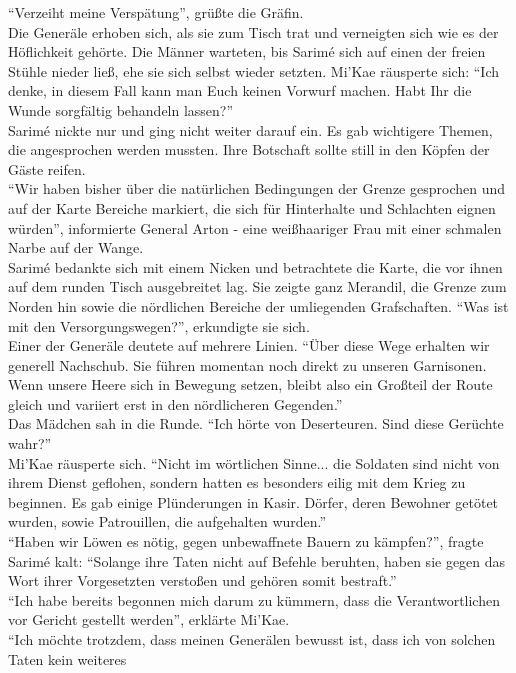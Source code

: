 ``Verzeiht meine Verspätung'', grüßte die Gräfin.\\
Die Generäle erhoben sich, als sie zum Tisch trat und verneigten sich wie es der Höflichkeit 
gehörte. Die Männer warteten, bis Sarimé sich auf einen der freien Stühle nieder ließ, ehe sie sich 
selbst wieder setzten. Mi'Kae räusperte sich: ``Ich denke, in diesem Fall kann man Euch keinen 
Vorwurf machen. Habt Ihr die Wunde sorgfältig behandeln lassen?''\\
Sarimé nickte nur und ging nicht weiter darauf ein. Es gab wichtigere Themen, die angesprochen 
werden mussten. Ihre Botschaft sollte still in den Köpfen der Gäste reifen.\\
``Wir haben bisher über die natürlichen Bedingungen der Grenze gesprochen und auf der Karte 
Bereiche markiert, die sich für Hinterhalte und Schlachten eignen würden'', informierte General 
Arton - eine weißhaariger Frau mit einer schmalen Narbe auf der Wange.\\
Sarimé bedankte sich mit einem Nicken und betrachtete die Karte, die vor ihnen auf dem runden Tisch 
ausgebreitet lag. Sie zeigte ganz Merandil, die Grenze zum Norden hin sowie die nördlichen Bereiche 
der umliegenden Grafschaften. ``Was ist mit den Versorgungswegen?'', erkundigte sie sich.\\
Einer der Generäle deutete auf mehrere Linien. ``Über diese Wege erhalten wir generell Nachschub. 
Sie führen momentan noch direkt zu unseren Garnisonen. Wenn unsere Heere sich in Bewegung setzen, 
bleibt also ein Großteil der Route gleich und variiert erst in den nördlicheren Gegenden.''\\
Das Mädchen sah in die Runde. ``Ich hörte von Deserteuren. Sind diese Gerüchte wahr?''\\
Mi'Kae räusperte sich. ``Nicht im wörtlichen Sinne... die Soldaten sind nicht von ihrem Dienst 
geflohen, sondern hatten es besonders eilig mit dem Krieg zu beginnen. Es gab einige Plünderungen 
in Kasir. Dörfer, deren Bewohner getötet wurden, sowie Patrouillen, die aufgehalten wurden.''\\
``Haben wir Löwen es nötig, gegen unbewaffnete Bauern zu kämpfen?'', fragte Sarimé kalt: ``Solange 
ihre Taten nicht auf Befehle beruhten, haben sie gegen das Wort ihrer Vorgesetzten verstoßen und 
gehören somit bestraft.''\\
``Ich habe bereits begonnen mich darum zu kümmern, dass die Verantwortlichen vor Gericht gestellt 
werden'', erklärte Mi'Kae.\\
``Ich möchte trotzdem, dass meinen Generälen bewusst ist, dass ich von solchen Taten kein weiteres 
